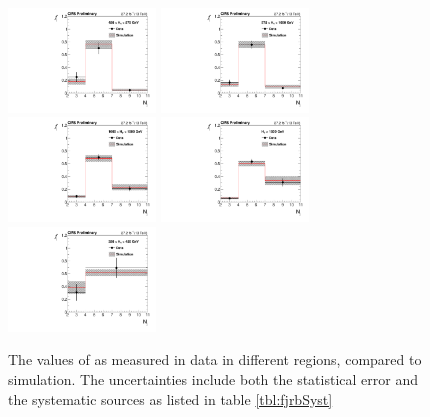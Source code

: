 \begin{figure}
	\centering
	\includegraphics[width=0.35\textwidth]{backgrounds/figs/f_jets_HT450to575_j2toInf_b0toInf}
	\includegraphics[width=0.35\textwidth]{backgrounds/figs/f_jets_HT575to1000_j2toInf_b0toInf}
	\includegraphics[width=0.35\textwidth]{backgrounds/figs/f_jets_HT1000to1500_j2toInf_b0toInf}
	\includegraphics[width=0.35\textwidth]{backgrounds/figs/f_jets_HT1500toInf_j2toInf_b0toInf.pdf}
	\includegraphics[width=0.35\textwidth]{backgrounds/figs/f_jets_HT250to450_j2toInf_b0toInf}
	\caption{The values of \fj as measured in data in different \HT regions, compared to simulation. The uncertainties include both the statistical error and the systematic sources as listed in table \ref{tbl:fjrbSyst}}
	\label{fig:fj}
\end{figure}
